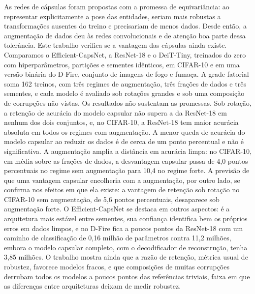 As redes de cápsulas foram propostas com a promessa de equivariância: ao representar explicitamente a pose das entidades, seriam mais robustas a transformações ausentes do treino e precisariam de menos dados. Desde então, a augmentação de dados deu às redes convolucionais e de atenção boa parte dessa tolerância. Este trabalho verifica se a vantagem das cápsulas ainda existe. Comparamos o Efficient-CapsNet, a ResNet-18 e o DeiT-Tiny, treinados do zero com hiperparâmetros, partições e sementes idênticos, em CIFAR-10 e em uma versão binária do D-Fire, conjunto de imagens de fogo e fumaça. A grade fatorial soma 162 treinos, com três regimes de augmentação, três frações de dados e três sementes, e cada modelo é avaliado sob rotações grandes e sob uma composição de corrupções não vistas. Os resultados não sustentam as promessas. Sob rotação, a retenção de acurácia do modelo capsular não supera a da ResNet-18 em nenhum dos dois conjuntos, e, no CIFAR-10, a ResNet-18 tem maior acurácia absoluta em todos os regimes com augmentação. A menor queda de acurácia do modelo capsular ao reduzir os dados é de cerca de um ponto percentual e não é significativa. A augmentação amplia a distância em acurácia limpa: no CIFAR-10, em média sobre
as frações de dados, a desvantagem capsular passa de 4,0 pontos percentuais no
regime sem augmentação para 10,4 no regime forte. A previsão de que uma
vantagem capsular encolheria com a augmentação, por outro lado, se confirma nos
efeitos em que ela existe: a vantagem de retenção sob rotação no CIFAR-10 sem
augmentação, de 5,6 pontos percentuais, desaparece sob augmentação forte. O Efficient-CapsNet se destaca em outros aspectos: é a arquitetura mais estável entre sementes, sua confiança identifica bem os próprios erros em dados limpos, e no D-Fire fica a poucos pontos da ResNet-18 com um
caminho de classificação de 0,16 milhão de parâmetros contra 11,2 milhões,
embora o modelo capsular completo, com o decodificador de reconstrução, tenha
3,85 milhões. O trabalho mostra ainda que a razão de retenção, métrica usual de robustez, favorece modelos fracos, e que composições de muitas
corrupções derrubam todos os modelos a poucos pontos das referências triviais,
faixa em que as diferenças entre arquiteturas deixam de medir robustez.
